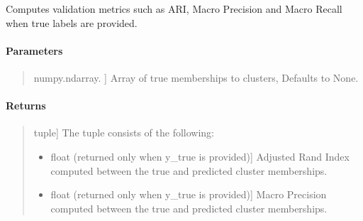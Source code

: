 \documentclass[letterpaper,10pt,english,openany,oneside]{sphinxmanual}
\begin{document}

\begin{fulllineitems}
\label{\detokenize{api_reference/generated/QuadratiK.spherical_clustering.PKBC:QuadratiK.spherical_clustering.PKBC.validation}}
\pysigstartsignatures
{}
\pysigstopsignatures
\sphinxAtStartPar
Computes validation metrics such as ARI, Macro Precision 
and Macro Recall when true labels are provided.


\paragraph{Parameters}
\label{\detokenize{api_reference/generated/QuadratiK.spherical_clustering.PKBC:id3}}\begin{quote}
\begin{description}
\sphinxlineitem{y\_true}{[}numpy.ndarray. {]}
\sphinxAtStartPar
Array of true memberships to clusters,
Defaults to None.

\end{description}
\end{quote}


\paragraph{Returns}
\label{\detokenize{api_reference/generated/QuadratiK.spherical_clustering.PKBC:id4}}\begin{quote}
\begin{description}
\sphinxlineitem{validation metrics}{[}tuple{]}
\sphinxAtStartPar
The tuple consists of the following:
\begin{itemize}
\item {} \begin{description}
\sphinxlineitem{Adjusted Rand Index}{[}float (returned only when y\_true is provided){]}
\sphinxAtStartPar
Adjusted Rand Index computed between the true and predicted cluster memberships.

\end{description}

\item {} \begin{description}
\sphinxlineitem{Macro Precision}{[}float (returned only when y\_true is provided){]}
\sphinxAtStartPar
Macro Precision computed between the true and predicted cluster memberships.


\end{description}
\end{itemize}
\end{description}
\end{quote}
\end{fulllineitems}
\end{document}

